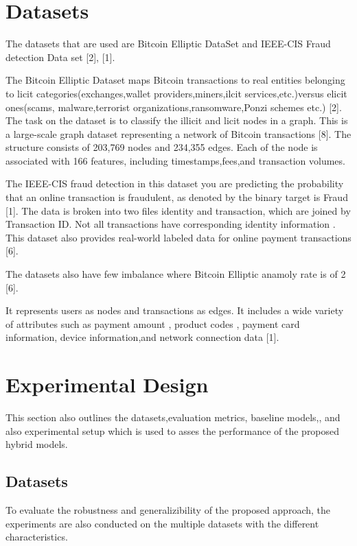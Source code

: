 \documentclass[conference]{IEEEtran}
\begin{document}

\section{Datasets}

The datasets that are used are Bitcoin Elliptic DataSet and IEEE-CIS Fraud detection Data set [2], [1].

The Bitcoin Elliptic Dataset maps Bitcoin transactions to real entities belonging to licit categories(exchanges,wallet providers,miners,ilcit services,etc.)versus elicit ones(scams, malware,terrorist organizations,ransomware,Ponzi schemes etc.) [2]. The task on the dataset is to classify the illicit and licit nodes in a graph. This is a large-scale graph dataset representing a network of Bitcoin transactions [8]. The structure consists of 203,769 nodes and 234,355 edges. Each of the node is associated with 166 features, including timestamps,fees,and transaction volumes.

The IEEE-CIS fraud detection in this dataset you are predicting the probability that an online transaction is fraudulent, as denoted by the binary target is Fraud [1]. The data is broken into two files identity and transaction, which are joined by Transaction ID. Not all transactions have corresponding identity information . This dataset also provides real-world labeled data for online payment transactions [6].

The datasets also have few imbalance where Bitcoin Elliptic anamoly rate is of 2 [6].

It represents users as nodes and transactions as edges. It includes a wide variety of attributes such as payment amount , product codes , payment card information, device information,and network connection data [1].


\section{Experimental Design}
This section also outlines the datasets,evaluation metrics, baseline models,, and also experimental setup which is used to asses the performance of the proposed hybrid models.

\subsection{Datasets}
To evaluate the robustness and generalizibility of the proposed approach, the experiments are also conducted on the multiple datasets with the different characteristics.
\end{document}
